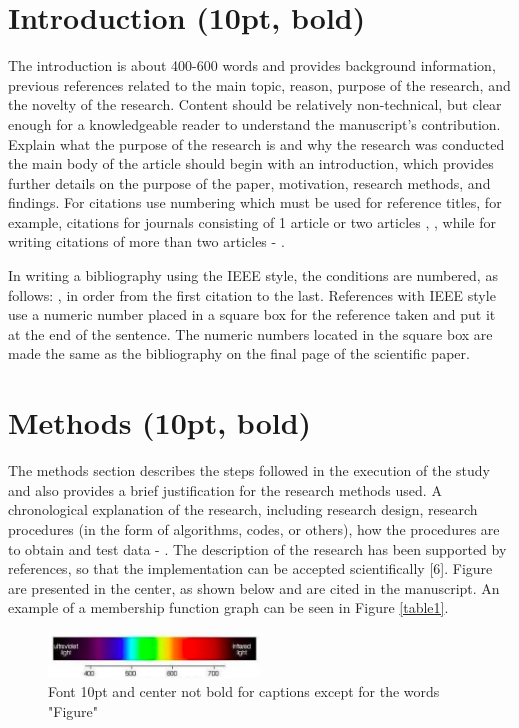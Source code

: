 \documentclass{article}
\begin{document}
\section{Introduction (10pt, bold)}
The introduction is about 400-600 words and provides background information, previous references related to the main topic, reason, purpose of the research, and the novelty of the research.  Content should be relatively non-technical, but clear enough for a knowledgeable reader to understand the manuscript’s contribution. Explain what the purpose of the research is and why the research was conducted the main body of the article should begin with an introduction, which provides further details on the purpose of the paper, motivation, research methods, and findings. For citations use numbering which must be used for reference titles, for example, citations for journals consisting of 1 article  \cite{Septiawan1} or two articles \cite{Septiawan2}, \cite{Lucy}, while for writing citations of more than two articles \cite{Gingold} - \cite{Morikawa}.

In writing a bibliography using the IEEE style, the conditions are numbered, as follows: \cite{Septiawan1}, in order from the first citation to the last. References with IEEE style use a numeric number placed in a square box for the reference taken and put it at the end of the sentence. The numeric numbers located in the square box are made the same as the bibliography on the final page of the scientific paper.

\section{Methods (10pt, bold)}
The methods section describes the steps followed in the execution of the study and also provides a brief justification for the research methods used. A chronological explanation of the research, including research design, research procedures (in the form of algorithms, codes, or others), how the procedures are to obtain and test data \cite{Lo} - \cite{Hang}. The description of the research has been supported by references, so that the implementation can be accepted scientifically [6]. Figure are presented in the center, as shown below and are cited in the manuscript. An example of a membership function graph can be seen in Figure \ref{table1}.

\begin{figure}[h]
	\centering
	\includegraphics[width=0.5\textwidth]{images/figur1.PNG}
	\caption{Font 10pt and center not bold for captions except for the words "Figure"}
	\label{fig1}
\end{figure}
\end{document}

